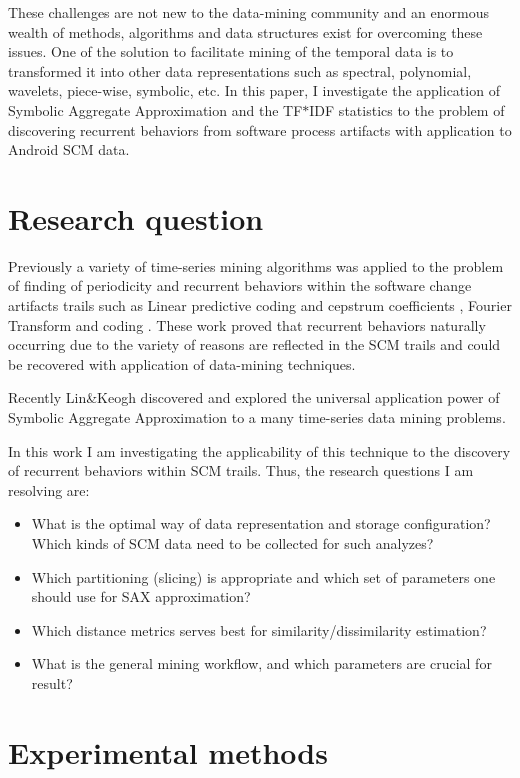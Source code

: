 \documentclass[10pt, conference, compsocconf]{IEEEtran}
\begin{document}
These challenges are not new to the data-mining community and an enormous wealth 
of methods, algorithms and data structures exist for overcoming these issues.
One of the solution to facilitate mining of the temporal data is to transformed 
it into other data representations such as spectral, polynomial, wavelets, piece-wise, 
symbolic, etc. In this paper, I investigate the application of 
Symbolic Aggregate Approximation \cite{citeulike:2821475} and the TF$\ast$IDF 
statistics \cite{citeulike:3056638} to the problem of discovering recurrent 
behaviors from software process artifacts with application to Android SCM data.

\section{Research question}
Previously a variety of time-series mining algorithms was applied to the 
problem of finding of periodicity and recurrent behaviors within the software 
change artifacts trails such as Linear predictive coding and cepstrum 
coefficients \cite{citeulike:3378725}, Fourier Transform \cite{citeulike:10377345}
and coding \cite{citeulike:10377366}. These work proved that recurrent behaviors 
naturally occurring due to the variety of reasons are reflected in the 
SCM trails and could be recovered with application of data-mining techniques.

Recently Lin\&Keogh \cite{citeulike:2821475} discovered and explored the universal 
application power of Symbolic Aggregate Approximation to a many time-series data 
mining problems. 

In this work I am investigating the applicability of this technique to the discovery 
of recurrent behaviors within SCM trails. Thus, the research questions I am resolving
are: 
\begin{itemize}
 \item What is the optimal way of data representation and storage configuration? Which kinds of SCM data need to be collected for such analyzes?
 \item Which partitioning (slicing) is appropriate and which set of parameters one should use for SAX approximation?
 \item Which distance metrics serves best for similarity/dissimilarity estimation?
 \item What is the general mining workflow, and which parameters are crucial for result?
\end{itemize}

\section{Experimental methods}
\end{document}
